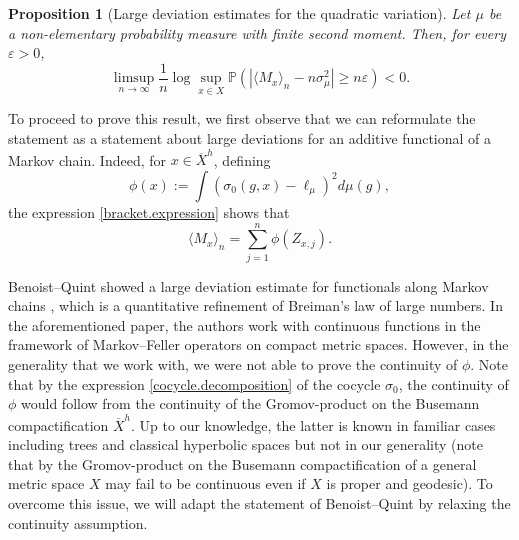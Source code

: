 \documentclass[JEP,XML,SOM,Unicode,published]{cedram}
\let\epsilon\varepsilon
\theoremstyle{plain}
\newtheorem{proposition}[theorem]{Proposition}
\theoremstyle{definition}
\newcommand\p{\mathbb{P}}
\begin{document}
\begin{proposition}[Large deviation estimates for the quadratic variation]
\label{prop.bracket.large.dev} Let $\mu$ be a non-elementary probability measure with finite second moment. Then, for every $\epsilon>0$,
\[
\limsup_{n\to \infty}\frac{1}{n} \log \sup_{x\in X}\p(| \langle M_x \rangle_n - n \sigma_{\mu}^2 | \geq n \epsilon)<0.
\]
\end{proposition}

To proceed to prove this result, we first observe that we can reformulate the statement as a statement about large deviations for an additive functional of a Markov chain. Indeed, for $x\in \overline{X}^h$, defining
\begin{equation}\label{eq.def.phi}
\phi(x):=\int{(\sigma_0(g,x) -\ell_{\mu})^2 d\mu(g)},
\end{equation}
the expression \eqref{bracket.expression} shows that
\[
\langle M_x \rangle_n=\sum_{j=1}^n{\phi(Z_{x,j})}.
\]

Benoist--Quint showed a large deviation estimate for functionals along Markov chains \cite[Prop.\,3.1]{BQ.CLT}, which is a quantitative refinement of Breiman's law of large numbers. In the aforementioned paper, the authors work with continuous functions in the framework of Markov--Feller operators on compact metric spaces. However, in the generality that we work with, we were not able to prove the continuity of $\phi$. Note that by the expression \eqref{cocycle.decomposition} of the cocycle $\sigma_0$, the continuity of $\phi$ would follow from the continuity of the Gromov-product on the Busemann compactification $\overline{X}^h$.
Up to our knowledge, the latter is known in familiar cases including trees and classical hyperbolic spaces but not in our generality (note that by \cite[\S 10]{miyachi} the Gromov-product on the Busemann compactification of a general metric space $X$ may fail to be continuous even if $X$ is proper and geodesic). To overcome this issue, we will adapt the statement of Benoist--Quint by relaxing the continuity assumption.
\end{document}
